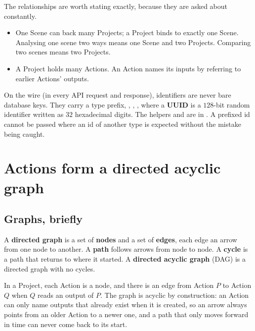 The relationships are worth stating exactly, because they are asked about constantly.
\begin{itemize}
\item One Scene can back many Projects; a Project binds to exactly one Scene. Analysing one scene
two ways means one Scene and two Projects. Comparing two scenes means two Projects.
\item A Project holds many Actions. An Action names its inputs by referring to earlier Actions'
outputs.
\end{itemize}

On the wire (in every API request and response), identifiers are never bare database keys. They
carry a type prefix, , , , where a
\textbf{UUID} is a $128$-bit random identifier written as $32$ hexadecimal digits.
The helpers  and  are in
. A prefixed id cannot be passed where an id of another
type is expected without the mistake being caught.

\section{Actions form a directed acyclic graph}\label{sec:product:dag}

\subsection{Graphs, briefly}

\begin{definition}
A \textbf{directed graph} is a set of \textbf{nodes} and a set of \textbf{edges}, each edge an
arrow from one node to another. A \textbf{path} follows arrows from node to node. A
\textbf{cycle} is a path that returns to where it started. A \textbf{directed acyclic graph}
(DAG) is a directed graph with no cycles.
\end{definition}

In a Project, each Action is a node, and there is an edge from Action $P$ to Action $Q$ when $Q$
reads an output of $P$. The graph is acyclic by construction: an Action can only name outputs that
already exist when it is created, so an arrow always points from an older Action to a newer one,
and a path that only moves forward in time can never come back to its start.

